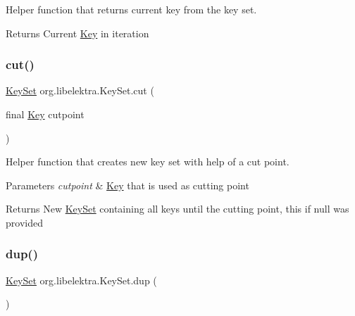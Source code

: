 Helper function that returns current key from the key set. 

\begin{DoxyReturn}{Returns}
Current \hyperlink{classorg_1_1libelektra_1_1Key}{Key} in iteration 
\end{DoxyReturn}
\mbox{\label{classorg_1_1libelektra_1_1KeySet_a470743c3a6f873427d057c6ce7e3661c}} 
\subsubsection{\texorpdfstring{cut()}{cut()}}
{\footnotesize\ttfamily \hyperlink{classorg_1_1libelektra_1_1KeySet}{Key\+Set} org.\+libelektra.\+Key\+Set.\+cut (\begin{DoxyParamCaption}\item[{final \hyperlink{classorg_1_1libelektra_1_1Key}{Key}}]{cutpoint }\end{DoxyParamCaption})\hspace{0.3cm}{\ttfamily [inline]}}



Helper function that creates new key set with help of a cut point. 


\begin{DoxyParams}{Parameters}
{\em cutpoint} & \hyperlink{classorg_1_1libelektra_1_1Key}{Key} that is used as cutting point \\
\hline
\end{DoxyParams}
\begin{DoxyReturn}{Returns}
New \hyperlink{classorg_1_1libelektra_1_1KeySet}{Key\+Set} containing all keys until the cutting point, this if null was provided 
\end{DoxyReturn}
\mbox{\label{classorg_1_1libelektra_1_1KeySet_af3571c68cd55983c45666cf9f75143a1}} 
\subsubsection{\texorpdfstring{dup()}{dup()}}
{\footnotesize\ttfamily \hyperlink{classorg_1_1libelektra_1_1KeySet}{Key\+Set} org.\+libelektra.\+Key\+Set.\+dup (\begin{DoxyParamCaption}{ }\end{DoxyParamCaption})\hspace{0.3cm}{\ttfamily [inline]}}



